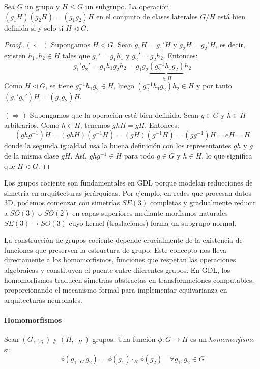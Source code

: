 \begin{proposition}\label{prop:cociente_bien_definido}
Sea $G$ un grupo y $H \leq G$ un subgrupo. La operación $(g_1H)(g_2H) = (g_1g_2)H$ en el conjunto de clases laterales $G/H$ está bien definida si y solo si $H \triangleleft G$.
\end{proposition}

\begin{proof}
$(\Leftarrow)$ Supongamos $H \triangleleft G$. Sean $g_1H = g_1'H$ y $g_2H = g_2'H$, es decir, existen $h_1, h_2 \in H$ tales que $g_1' = g_1h_1$ y $g_2' = g_2h_2$. Entonces:
\[
g_1'g_2' = g_1h_1g_2h_2 = g_1g_2\underbrace{(g_2^{-1}h_1g_2)}_{\in H}h_2
\]
Como $H \triangleleft G$, se tiene $g_2^{-1}h_1g_2 \in H$, luego $(g_2^{-1}h_1g_2)h_2 \in H$ y por tanto $(g_1'g_2')H = (g_1g_2)H$.

$(\Rightarrow)$ Supongamos que la operación está bien definida. Sean $g \in G$ y $h \in H$ arbitrarios. Como $h \in H$, tenemos $ghH = gH$. Entonces:
\[
(ghg^{-1})H = (ghH)(g^{-1}H) = (gH)(g^{-1}H) = (gg^{-1})H = eH = H
\]
donde la segunda igualdad usa la buena definición con los representantes $gh$ y $g$ de la misma clase $gH$. Así, $ghg^{-1} \in H$ para todo $g \in G$ y $h \in H$, lo que significa que $H \triangleleft G$.
\end{proof}

Los grupos cociente son fundamentales en \gls{GDL} porque modelan reducciones de simetría en arquitecturas jerárquicas. Por ejemplo, en redes que procesan datos 3D, podemos comenzar con simetrías $SE(3)$ completas y gradualmente reducir a $SO(3)$ o $SO(2)$ en capas superiores mediante morfismos naturales $SE(3) \rightarrow SO(3)$ cuyo kernel (traslaciones) forma un subgrupo normal.

La construcción de grupos cociente depende crucialmente de la existencia de funciones que preserven la estructura de grupo. Este concepto nos lleva directamente a los homomorfismos, funciones que respetan las operaciones algebraicas y constituyen el puente entre diferentes grupos. En \gls{GDL}, los homomorfismos traducen simetrías abstractas en transformaciones computables, proporcionando el mecanismo formal para implementar equivarianza en arquitecturas neuronales.

\paragraph{Homomorfismos}

\begin{definition}\label{def:homomorfismo_grupos}
Sean $(G, \cdot_G)$ y $(H, \cdot_H)$ grupos. Una función $\phi: G \rightarrow H$ es un \textit{homomorfismo} si:
\begin{equation}
\phi(g_1 \cdot_G g_2) = \phi(g_1) \cdot_H \phi(g_2) \quad \forall g_1, g_2 \in G
\end{equation}
\end{definition}

